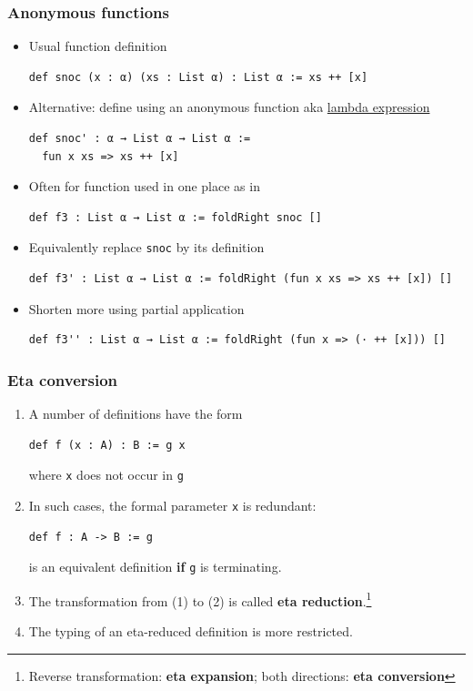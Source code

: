 \documentclass{beamer}
\begin{document}
\begin{frame}[fragile]
  \frametitle{Anonymous functions}
  \begin{itemize}
  \item<+-> Usual function definition
\begin{lstlisting}
def snoc (x : α) (xs : List α) : List α := xs ++ [x]
\end{lstlisting}
  \item<+->
  Alternative: define using an anonymous function aka
  \href{https://en.wikipedia.org/wiki/Anonymous_function}{lambda
    expression} 
\begin{lstlisting}
def snoc' : α → List α → List α :=
  fun x xs => xs ++ [x]
\end{lstlisting}
\item<+->
  Often for function used in one place as in
\begin{lstlisting}
def f3 : List α → List α := foldRight snoc []
\end{lstlisting}
\item<+-> Equivalently replace \texttt{snoc} by its definition
\begin{lstlisting}
def f3' : List α → List α := foldRight (fun x xs => xs ++ [x]) []
\end{lstlisting}
\item<+-> Shorten more using partial application
\begin{lstlisting}
def f3'' : List α → List α := foldRight (fun x => (· ++ [x])) []
\end{lstlisting}
\end{itemize}
\end{frame}
\begin{frame}[fragile]
  \frametitle{Eta conversion}
  \begin{enumerate}
  \item A number of definitions have the form
\begin{lstlisting}
def f (x : A) : B := g x
\end{lstlisting}
    where \texttt{x} does not occur in \texttt{g}
  \item 
    In such cases, the formal parameter \texttt{x} is redundant:
\begin{lstlisting}
def f : A -> B := g
\end{lstlisting}
    is an equivalent definition \textbf{if} \lstinline{g} is terminating.
  \item The transformation from (1) to (2) is called \textbf{eta reduction}.\footnote{Reverse transformation: \textbf{eta expansion}; both directions: \textbf{eta conversion}}
  \item The typing of an eta-reduced definition is more restricted.
\end{enumerate}
\end{frame}
\end{document}

